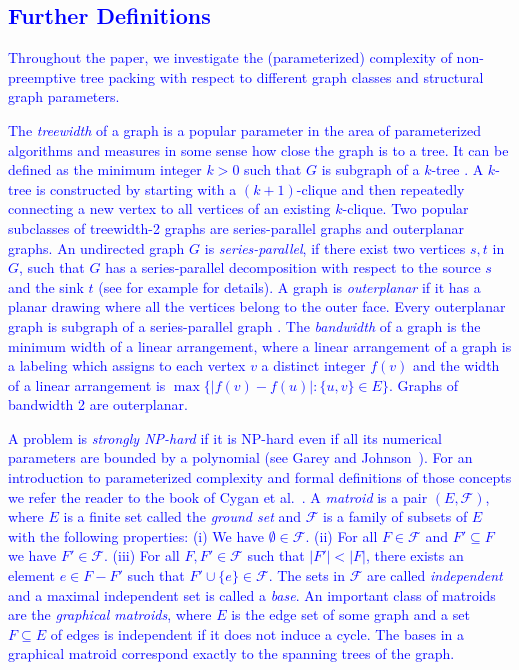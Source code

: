 \documentclass[runningheads]{llncs}
\newcommand{\set}[1]{\{ #1 \}}
\newcommand{\lasse}[1]{\textcolor{blue}{#1}}
\begin{document}
\subsection{\lasse{Further Definitions}}

\lasse{Throughout the paper, we investigate the (parameterized) complexity of non-preemptive tree packing 
with respect to different graph classes and structural graph parameters.}

\lasse{The \emph{treewidth} of a graph is a popular parameter in the area of parameterized algorithms and measures in some sense how close the graph is to a tree. It can be defined as the minimum integer $k > 0$ such that $G$ is subgraph of a $k$-tree \cite{bodlaender1998partial}. A $k$-tree is constructed by starting with a $(k +1)$-clique and then repeatedly
connecting a new vertex to all vertices of an existing $k$-clique.
Two popular subclasses of treewidth-2 graphs are series-parallel graphs and outerplanar graphs. An undirected graph $G$ is \emph{series-parallel}, if there exist two vertices $s,t$ in $G$, such that $G$ has a series-parallel decomposition with respect to the source $s$ and the sink $t$ (see for example \cite[p. 22]{bodlaender1998partial} for details).  A graph is \emph{outerplanar} if it has a planar drawing where all the vertices belong to the outer face. Every outerplanar graph is subgraph of a series-parallel graph  \cite{bodlaender1998partial}.
The \emph{bandwidth} of a graph is the minimum width of a linear arrangement, where a linear arrangement of a graph is a labeling which assigns to each vertex $v$ a distinct integer $f(v)$ and the width of a linear arrangement is $\max\set{|f(v)-f(u)| : \set{u,v} \in E}$. Graphs of bandwidth 2 are outerplanar.}

\lasse{A problem is \emph{strongly NP-hard} if it is NP-hard even if all its numerical parameters are bounded by a polynomial (see Garey and Johnson~\cite{garey1979computers}).
For an introduction to parameterized complexity and formal definitions of those concepts 
we refer the reader to the book of Cygan et al.~\cite{cygan2015parameterized}.}
\lasse{A \emph{matroid} is a pair $(E,\mathcal{F})$, where $E$ is a finite set called the \emph{ground set} and $\mathcal{F}$ is a family of subsets of $E$ with the following properties: (i) We have $\emptyset \in \mathcal{F}$. (ii) For all $F \in \mathcal{F}$ and $F' \subseteq F$ we have $F' \in \mathcal{F}$. (iii) For all $F,F' \in \mathcal{F}$ such that $|F'| < |F|$, there exists an element $e \in F - F'$ such that $F' \cup \set{e} \in \mathcal{F}$. The sets in $\mathcal{F}$ are called \emph{independent} and a maximal independent set is called a \emph{base}. An important class of matroids are the \emph{graphical matroids}, where $E$ is the edge set of some graph and a set $F \subseteq E$ of edges is independent if it does not induce a cycle. The bases in a graphical matroid correspond exactly to the spanning trees of the graph.
}
\end{document}
